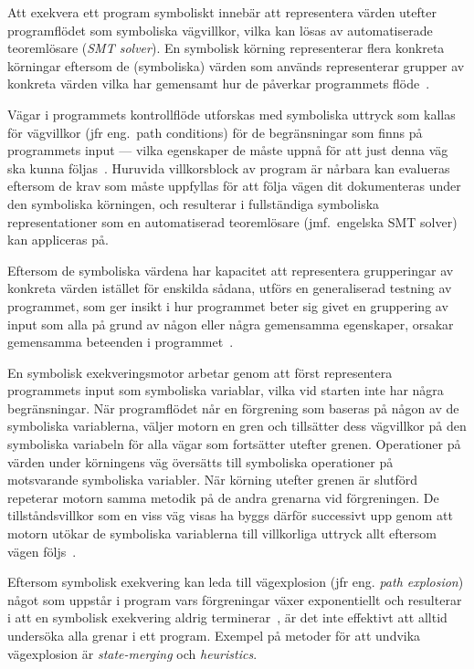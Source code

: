 Att exekvera ett program symboliskt innebär att representera värden utefter
programflödet som symboliska vägvillkor, vilka kan
lösas av automatiserade teoremlösare (\emph{SMT solver}). En symbolisk körning
representerar flera konkreta körningar eftersom de (symboliska) värden som
används representerar grupper av konkreta värden vilka har gemensamt hur de
påverkar programmets flöde~\cite{klee}.

Vägar i programmets kontrollflöde utforskas med symboliska uttryck som kallas
för vägvillkor (jfr eng.\ path conditions) för de begränsningar som finns på
programmets input --- vilka egenskaper de måste uppnå för att just denna väg
ska kunna följas~\cite{klee}. Huruvida villkorsblock av program är nårbara kan
evalueras eftersom de krav som måste uppfyllas för att följa vägen dit dokumenteras
under den symboliska körningen, och resulterar i fullständiga symboliska representationer
som en automatiserad teoremlösare (jmf.\ engelska SMT solver) kan appliceras på.

Eftersom de symboliska värdena har kapacitet att representera grupperingar av konkreta
värden istället för enskilda sådana, utförs en generaliserad testning av programmet,
som ger insikt i hur programmet beter sig givet en gruppering av input som alla
på grund av någon eller några gemensamma egenskaper, orsakar gemensamma beteenden
i programmet~\cite{Cadar}.

En symbolisk exekveringsmotor arbetar genom att först representera programmets
input som symboliska variablar, vilka vid starten inte har några begränsningar.
När programflödet når en förgrening som baseras på någon av de symboliska
variablerna, väljer motorn en gren och tillsätter dess vägvillkor på den
symboliska variabeln för alla vägar som fortsätter utefter grenen. Operationer
på värden under körningens väg översätts till symboliska operationer på
motsvarande symboliska variabler. När körning utefter grenen är
slutförd repeterar motorn samma metodik på de andra grenarna vid förgreningen. 
De tillståndsvillkor som en viss väg visas ha byggs därför
successivt upp genom att motorn utökar de symboliska variablerna till
villkorliga uttryck allt eftersom vägen följs~\cite{klee}.

Eftersom symbolisk exekvering kan leda till vägexplosion (jfr eng. \emph{path explosion}) 
något som uppstår i program vars förgreningar växer exponentiellt och resulterar 
i att en symbolisk exekvering aldrig terminerar~\cite{path_explo}, är det inte effektivt
att alltid undersöka alla grenar i ett program. Exempel på metoder för att
undvika vägexplosion är \emph{state-merging} och \emph{heuristics}.


